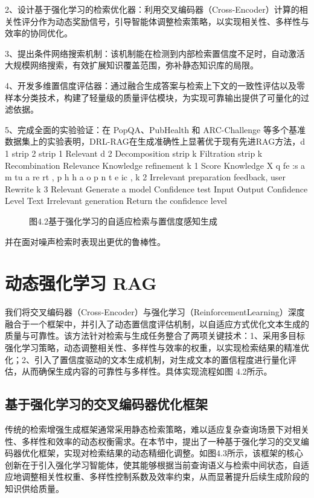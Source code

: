 \documentclass[12pt,a4paper,openright,UTF8]{ctexbook}
\begin{document}
2、设计基于强化学习的检索优化器：利用交叉编码器（Cross-Encoder）计算的相关性评分作为动态奖励信号，引导智能体调整检索策略，以实现相关性、多样性与效率的协同优化。


3、提出条件网络搜索机制：该机制能在检测到内部检索置信度不足时，自动激活大规模网络搜索，有效扩展知识覆盖范围，弥补静态知识库的局限。


4、开发多维置信度评估器：通过融合生成答案与检索上下文的一致性评估以及零样本分类技术，构建了轻量级的质量评估模块，为实现可靠输出提供了可量化的过滤依据。


5、完成全面的实验验证：在 PopQA、PubHealth 和 ARC-Challenge 等多个基准数据集上的实验表明，DRL-RAG在生成准确性上显著优于现有先进RAG方法，d 1 strip 2 strip 1 Relevant d 2 Decomposition strip k Filtration strip k Recombination Relevance Knowledge refinement k 1 Score Knowledge X q fe :s a m tu a re rt , p h h a o p n t e ic , k 2 Irrelevant preparation feedback, user Rewrite k 3 Relevant Generate a model Confidence test Input Output Confidence Level Text Irrelevant generation Return the confidence level

\begin{figure}[htbp]
\centering
{}
\caption{图4.2基于强化学习的自适应检索与置信度感知生成}
\end{figure}

并在面对噪声检索时表现出更优的鲁棒性。

\section{动态强化学习 RAG}

我们将交叉编码器（Cross-Encoder）与强化学习（ReinforcementLearning）深度融合于一个框架中，并引入了动态置信度评估机制，以自适应方式优化文本生成的质量与可靠性。该方法针对检索与生成任务整合了两项关键技术：1、采用多目标强化学习策略，动态调整相关性、多样性与效率的权重，以实现检索结果的精准优化；2、引入了置信度驱动的文本生成机制，对生成文本的置信程度进行量化评估，从而确保生成内容的可靠性与多样性。具体实现流程如图 4.2所示。

\subsection{基于强化学习的交叉编码器优化框架}

传统的检索增强生成框架通常采用静态检索策略，难以适应复杂查询场景下对相关性、多样性和效率的动态权衡需求。在本节中，提出了一种基于强化学习的交叉编码器优化框架，实现对检索结果的动态精细化调整。如图4.3所示，该框架的核心创新在于引入强化学习智能体，使其能够根据当前查询语义与检索中间状态，自适应地调整相关性权重、多样性控制系数及效率约束，从而显著提升后续生成阶段的知识供给质量。
\end{document}
